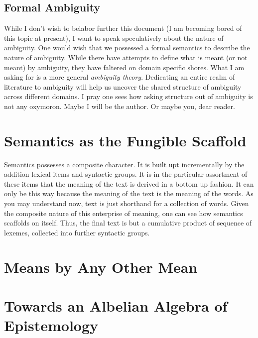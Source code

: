 \documentclass[12pt]{article}
\begin{document}
\subsection{Formal Ambiguity}
While I don't wish to belabor further this document (I am becoming bored of this
topic at present), I want to speak speculatively about the nature of ambiguity.
One would wish that we possessed a formal semantics to describe the nature of
ambiguity. While there have attempts to define what is meant (or not meant) by
ambiguity, they have faltered on domain specific shores. What I am asking for is
a more general \textit{ambiguity theory}. Dedicating an entire realm of
literature to ambiguity will help us uncover the shared structure of ambiguity
across different domains. I pray one sees how asking structure out of ambiguity
is not any oxymoron. Maybe I will be the author. Or maybe you, dear reader.

\section{Semantics as the Fungible Scaffold}
Semantics possesses a composite character. It is built upt incrementally by the
addition lexical items and syntactic groups. It is in the particular assortment
of these items that the meaning of the text is derived in a bottom up fashion.
It can only be this way because the meaning of the text is the meaning of the
words. As you may understand now, text is just shorthand for a collection of
words. Given the composite nature of this enterprise of meaning, one can see how
semantics scaffolds on itself. Thus, the final text is but a cumulative product
of sequence of lexemes, collected into further syntactic groups.

\section{Means by Any Other Mean}

\section{Towards an Albelian Algebra of Epistemology}
\end{document}
